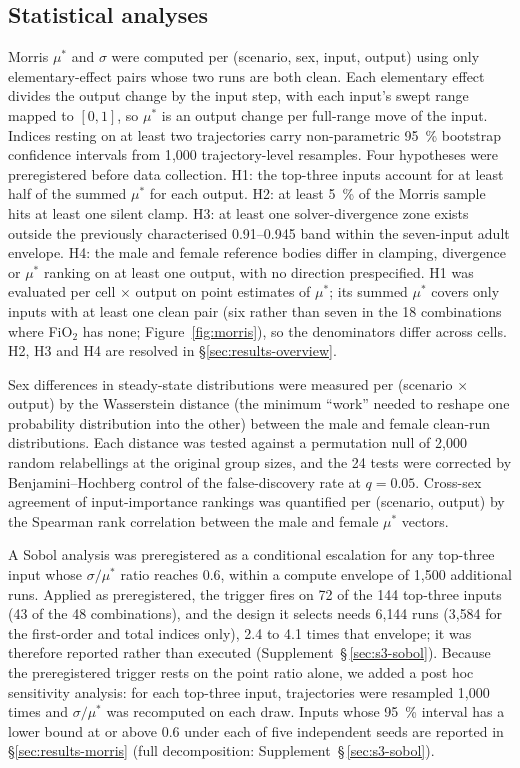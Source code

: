 \documentclass[pdflatex,sn-nature]{sn-jnl}%
\begin{document}
\subsection{Statistical analyses}\label{sec:methods-stats}

Morris $\mu^{*}$ and $\sigma$ were computed per (scenario, sex, input, output) using only elementary-effect pairs whose two runs are both clean. Each elementary effect divides the output change by the input step, with each input's swept range mapped to $[0,1]$, so $\mu^{*}$ is an output change per full-range move of the input. Indices resting on at least two trajectories carry non-parametric 95~\% bootstrap confidence intervals from 1{,}000 trajectory-level resamples. Four hypotheses were preregistered before data collection. H1: the top-three inputs account for at least half of the summed $\mu^{*}$ for each output. H2: at least 5~\% of the Morris sample hits at least one silent clamp. H3: at least one solver-divergence zone exists outside the previously characterised 0.91--0.945 band within the seven-input adult envelope. H4: the male and female reference bodies differ in clamping, divergence or $\mu^{*}$ ranking on at least one output, with no direction prespecified. H1 was evaluated per cell $\times$ output on point estimates of $\mu^{*}$; its summed $\mu^{*}$ covers only inputs with at least one clean pair (six rather than seven in the 18 combinations where FiO$_2$ has none; Figure~\ref{fig:morris}), so the denominators differ across cells. H2, H3 and H4 are resolved in \S\ref{sec:results-overview}.

Sex differences in steady-state distributions were measured per (scenario $\times$ output) by the Wasserstein distance (the minimum ``work'' needed to reshape one probability distribution into the other) between the male and female clean-run distributions. Each distance was tested against a permutation null of 2{,}000 random relabellings at the original group sizes, and the 24 tests were corrected by Benjamini--Hochberg control of the false-discovery rate at $q = 0.05$. Cross-sex agreement of input-importance rankings was quantified per (scenario, output) by the Spearman rank correlation between the male and female $\mu^{*}$ vectors.

A Sobol analysis was preregistered as a conditional escalation for any top-three input whose $\sigma / \mu^{*}$ ratio reaches 0.6, within a compute envelope of 1{,}500 additional runs. Applied as preregistered, the trigger fires on 72 of the 144 top-three inputs (43 of the 48 combinations), and the design it selects needs 6{,}144 runs (3{,}584 for the first-order and total indices only), 2.4 to 4.1 times that envelope; it was therefore reported rather than executed (Supplement~\S\,\ref{sec:s3-sobol}). Because the preregistered trigger rests on the point ratio alone, we added a post hoc sensitivity analysis: for each top-three input, trajectories were resampled 1{,}000 times and $\sigma / \mu^{*}$ was recomputed on each draw. Inputs whose 95~\% interval has a lower bound at or above 0.6 under each of five independent seeds are reported in \S\ref{sec:results-morris} (full decomposition: Supplement~\S\,\ref{sec:s3-sobol}).
\end{document}
